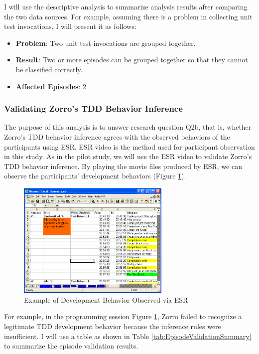 I will use the descriptive analysis to summarize analysis results
after comparing the two data sources. For example, assuming there is a
problem in collecting unit test invocations, I will present it as
follows:
\begin{itemize}
\item \textbf{Problem}: Two unit test invocations are grouped together.
\item \textbf{Result}: Two or more episodes can be grouped together so 
that they cannot be classified correctly.
\item \textbf{Affected Episodes}: 2
\end{itemize}

\subsubsection{Validating Zorro's TDD Behavior Inference}
The purpose of this analysis is to answer research question Q2b, that
is, whether Zorro's TDD behavior inference agrees with the observed
behaviors of the participants using ESR. ESR video is the method used
for participant observation in this study. As in the pilot study, we
will use the ESR video to validate Zorro's TDD behavior inference. By
playing the movie files produced by ESR, we can observe the
participants' development behaviors (Figure
\ref{fig:VideoZorroComparison}).
\begin{figure}[htbp]
  \centering
  \includegraphics[width=0.65\textwidth]{figs/VideoZorroComparison.eps}
  \caption{Example of Development Behavior Observed via ESR}\label{fig:VideoZorroComparison}
\end{figure}
For example, in the programming session Figure
\ref{fig:VideoZorroComparison}, Zorro failed to recognize a legitimate
TDD development behavior because the inference rules were
insufficient. I will use a table as shown in Table
\ref{tab:EpisodeValidationSummary} to summarize the episode validation results.
